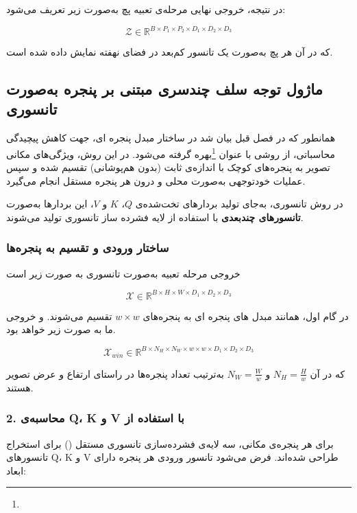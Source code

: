 در نتیجه، خروجی نهایی مرحله‌ی تعبیه پچ به‌صورت زیر تعریف می‌شود:

\[
\mathcal{Z} \in \mathbb{R}^{B \times P_1 \times P_2 \times D_1 \times D_2 \times D_3}
\]

که در آن هر پچ به‌صورت یک تانسور کم‌بعد در فضای نهفته نمایش داده شده است.


\subsection{ماژول توجه سلف چندسری مبتنی بر پنجره به‌صورت تانسوری}

همانطور که در فصل قبل بیان شد در ساختار مبدل پنجره ای، جهت کاهش پیچیدگی محاسباتی، از روشی با عنوان  \footnote{}بهره گرفته می‌شود. در این روش، ویژگی‌های مکانی تصویر به پنجره‌های کوچک با اندازه‌ی ثابت (بدون هم‌پوشانی) تقسیم شده و سپس عملیات  خود‌توجهی به‌صورت محلی و درون هر پنجره مستقل انجام می‌گیرد.

در روش تانسوری، به‌جای تولید بردارهای تخت‌شده‌ی $Q$، $K$ و $V$، این بردارها به‌صورت \textbf{تانسورهای چندبعدی} با استفاده از لایه فشرده ساز تانسوری تولید می‌شوند.

\subsubsection*{ ساختار ورودی و تقسیم به پنجره‌ها}

خروجی مرحله تعبیه  به‌صورت تانسوری به صورت زیر است 

\[
\mathcal{X} \in \mathbb{R}^{B \times H \times W \times D_1 \times D_2 \times D_3}
\]



در گام اول، همانند مبدل های پنجره ای به پنجره‌های $w \times w$ تقسیم می‌شوند. و خروجی ما به صورت  زیر خواهد بود.

\[
\mathcal{X}_{win} \in \mathbb{R}^{B \times N_H \times N_W \times w \times w \times D_1 \times D_2 \times D_3}
\]

که در آن $N_H = \frac{H}{w}$ و $N_W = \frac{W}{w}$ به‌ترتیب تعداد پنجره‌ها در راستای ارتفاع و عرض تصویر هستند.

\subsubsection*{2. محاسبه‌ی Q، K و V با استفاده از }

برای هر پنجره‌ی مکانی، سه لایه‌ی فشرده‌سازی تانسوری مستقل () برای استخراج تانسورهای Q، K و V طراحی شده‌اند. فرض می‌شود تانسور ورودی هر پنجره دارای ابعاد:

